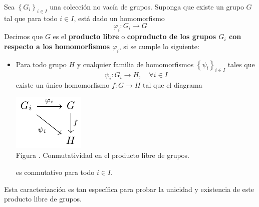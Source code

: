 \documentclass[12pt]{report}
\newcounter{it}
\theoremstyle{largebreak}
\newcommand\cf[3]{\ensuremath{#1:#2\rightarrow#3}}
\newcounter{figcount}
\begin{document}
    \begin{mydef}
        Sea $\left\{G_i \right\}_{ i\in I}$ una colección no vacía de grupos. Suponga que existe un grupo $G$ tal que para todo $i\in I$, está dado un homomorfismo
        \begin{equation*}
            \cf{\varphi_i}{G_i}{G}
        \end{equation*}
        Decimos que $G$ es el \textbf{producto libre} o \textbf{coproducto de los grupos $G_i$ con respecto a los homomorfismos $\varphi_i$}, si se cumple lo siguiente:
        
        \begin{itemize}
            \item Para todo grupo $H$ y cualquier familia de homomorfismos $\left\{\psi_i \right\}_{ i\in I}$ tales que
            \begin{equation*}
                \cf{\psi_i}{G_i}{H},\quad\forall i\in I
            \end{equation*}
            existe un único homomorfismo $\cf{f}{G}{H}$ tal que el diagrama
    
            \begin{minipage}{\textwidth}
                \begin{center}
                    \includegraphics[scale=1.5]{images/fig_10.pdf}\\
                    Figura \thefigcount. Conmutatividad en el producto libre de grupos.
                \end{center}
            \end{minipage}
    
            es conmutativo para todo $i\in I$.
        \end{itemize}
    \end{mydef}

    Esta caracterización es tan específica para probar la unicidad y existencia de este producto libre de grupos.
\end{document}

